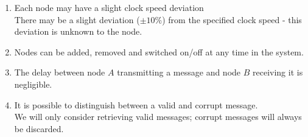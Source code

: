 \begin{enumerate}
\item \label{ass:diffspeed} Each node may have a slight clock speed deviation \\
There may be a slight deviation ($\pm 10\%$) from the specified clock speed - this deviation is unknown to the node.
\item \label{ass:alternodes} Nodes can be added, removed and switched on/off at any time in the system.
\item \label{ass:speedymsg} The delay between node $A$ transmitting a message and node $B$ receiving it is negligible.
\item \label{ass:corruptmsg} It is possible to distinguish between a valid and corrupt message. \\
We will only consider retrieving valid messages; corrupt messages will always be discarded.
\end{enumerate}
